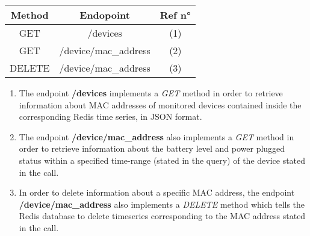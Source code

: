 \documentclass{article}
\begin{document}
\begin{table}[h!]
	\centering
\begin{tabular}{|c|c|c|}
\hline
\textbf{Method} & \textbf{Endopoint} & \textbf{Ref n°}\\
\hline
GET	& /devices & (1)	\\
\hline
GET	& /device/{mac\_address} &	(2)\\
\hline
DELETE	& /device/{mac\_address} & 	(3)\\
\hline
\end{tabular}
\end{table}

\begin{enumerate}
	\item The endpoint \textbf{/devices} implements a \textit{GET} method in order to retrieve information about MAC addresses of monitored devices contained inside the corresponding Redis time series, in JSON format.
	\item The endpoint \textbf{/device/mac\_address} also implements a \textit{GET} method in order to retrieve information about the battery level and power plugged status within a specified time-range (stated in the query) of the device stated in the call. 
	\item In order to delete information about a specific MAC address, the endpoint \textbf{/device/mac\_address} also implements a \textit{DELETE} method which tells the Redis database to delete timeseries corresponding to the MAC address stated in the call.
\end{enumerate}
\end{document}
